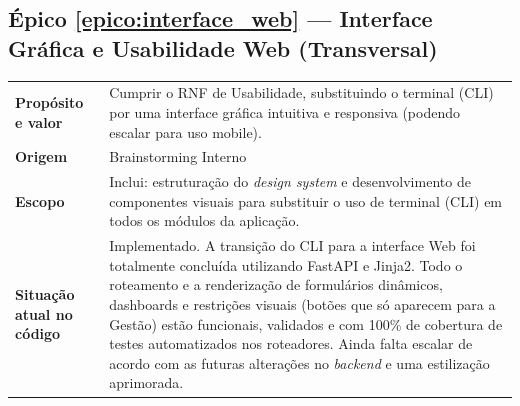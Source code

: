 \documentclass[12pt,a4paper]{article}
\newcounter{epico}
\begin{document}
\subsection*{Épico \ref{epico:interface_web} --- Interface Gráfica e Usabilidade Web (Transversal)}
\renewcommand{\arraystretch}{1.5}
\begin{table}[H]
    \centering
    \begin{tabular}{|m{4.5cm} | m{11cm}|}
    \hline
    \textbf{Propósito e valor} &
    Cumprir o RNF de Usabilidade, substituindo o terminal (CLI) por uma interface gráfica intuitiva e responsiva (podendo escalar para uso mobile). \\
    \textbf{Origem} & Brainstorming Interno \\
    \textbf{Escopo}& Inclui: estruturação do \textit{design system} e desenvolvimento de componentes visuais  para substituir o uso de terminal (CLI) em todos os módulos da aplicação.\\
    \textbf{Situação atual no código}& Implementado. A transição do CLI para a interface Web foi totalmente concluída utilizando FastAPI e Jinja2. Todo o roteamento e a renderização de formulários dinâmicos, dashboards e restrições visuais (botões que só aparecem para a Gestão) estão funcionais, validados e com 100\% de cobertura de testes automatizados nos roteadores. Ainda falta escalar de acordo com as futuras alterações no \textit{backend} e uma estilização aprimorada.\\
    \hline
    \end{tabular}
\end{table}
\end{document}
